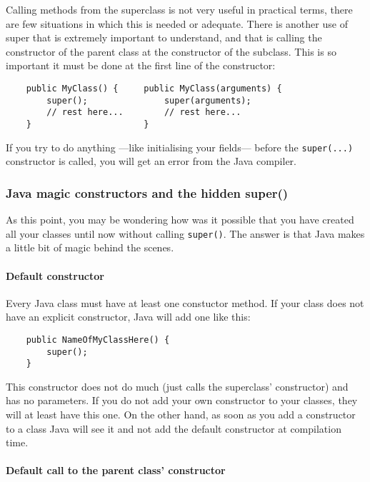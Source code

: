 Calling methods from the superclass is not very useful in practical
terms, there are few situations in which this is needed or
adequate. There is another use of super that is extremely important to
understand, and that is calling the constructor of the parent class
at the constructor of the subclass. This is so important it must be
done at the first line of the constructor: 

\begin{verbatim}
    public MyClass() {     public MyClass(arguments) {
        super();               super(arguments);
        // rest here...        // rest here...    
    }                      }
\end{verbatim}

If you try to do anything ---like initialising your fields--- before
the \verb+super(...)+ constructor is called, you will get an error
from the Java compiler. 

\subsubsection*{Java magic constructors and the hidden super()}
\label{sec:hidden-super}

As this point, you may be wondering how was it possible that you have
created all your classes until now without calling \verb+super()+. The
answer is that Java makes a little bit of magic behind the scenes. 

\paragraph{Default constructor}
\label{sec:default-constructor}

Every Java class must have at least one constuctor method. If your
class does not have an explicit constructor, Java will add one like
this: 

\begin{verbatim}
    public NameOfMyClassHere() {
        super();
    }
\end{verbatim}

This constructor does not do much (just calls the superclass'
constructor) and has no parameters. If you do not add your own
constructor to your classes, they will at least have this one. On the
other hand, as soon as you add a constructor to a class Java will see
it and not add the default constructor at compilation time. 

\paragraph{Default call to the parent class' constructor}
\label{sec:default-call-parent}

